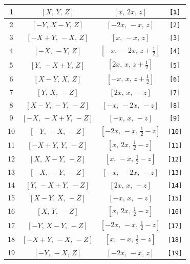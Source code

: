 \documentclass[fleqn,8pt]{jsarticle}
\begin{document}
\begin{longtable}{cccc}
1 & $\left[ X,\, Y,\, Z \right]$ & $\left[ x,\, 2 x,\, z \right]$ & {\tt [1]} \\ \hline
2 & $\left[ - Y,\, X - Y,\, Z \right]$ & $\left[ - 2 x,\, - x,\, z \right]$ & {\tt [2]} \\ \hline
3 & $\left[ - X + Y,\, - X,\, Z \right]$ & $\left[ x,\, - x,\, z \right]$ & {\tt [3]} \\ \hline
4 & $\left[ - X,\, - Y,\, Z \right]$ & $\left[ - x,\, - 2 x,\, z + \frac{1}{2} \right]$ & {\tt [4]} \\ \hline
5 & $\left[ Y,\, - X + Y,\, Z \right]$ & $\left[ 2 x,\, x,\, z + \frac{1}{2} \right]$ & {\tt [5]} \\ \hline
6 & $\left[ X - Y,\, X,\, Z \right]$ & $\left[ - x,\, x,\, z + \frac{1}{2} \right]$ & {\tt [6]} \\ \hline
7 & $\left[ Y,\, X,\, - Z \right]$ & $\left[ 2 x,\, x,\, - z \right]$ & {\tt [7]} \\ \hline
8 & $\left[ X - Y,\, - Y,\, - Z \right]$ & $\left[ - x,\, - 2 x,\, - z \right]$ & {\tt [8]} \\ \hline
9 & $\left[ - X,\, - X + Y,\, - Z \right]$ & $\left[ - x,\, x,\, - z \right]$ & {\tt [9]} \\ \hline
10 & $\left[ - Y,\, - X,\, - Z \right]$ & $\left[ - 2 x,\, - x,\, \frac{1}{2} - z \right]$ & {\tt [10]} \\ \hline
11 & $\left[ - X + Y,\, Y,\, - Z \right]$ & $\left[ x,\, 2 x,\, \frac{1}{2} - z \right]$ & {\tt [11]} \\ \hline
12 & $\left[ X,\, X - Y,\, - Z \right]$ & $\left[ x,\, - x,\, \frac{1}{2} - z \right]$ & {\tt [12]} \\ \hline
13 & $\left[ - X,\, - Y,\, - Z \right]$ & $\left[ - x,\, - 2 x,\, - z \right]$ & {\tt [13]} \\ \hline
14 & $\left[ Y,\, - X + Y,\, - Z \right]$ & $\left[ 2 x,\, x,\, - z \right]$ & {\tt [14]} \\ \hline
15 & $\left[ X - Y,\, X,\, - Z \right]$ & $\left[ - x,\, x,\, - z \right]$ & {\tt [15]} \\ \hline
16 & $\left[ X,\, Y,\, - Z \right]$ & $\left[ x,\, 2 x,\, \frac{1}{2} - z \right]$ & {\tt [16]} \\ \hline
17 & $\left[ - Y,\, X - Y,\, - Z \right]$ & $\left[ - 2 x,\, - x,\, \frac{1}{2} - z \right]$ & {\tt [17]} \\ \hline
18 & $\left[ - X + Y,\, - X,\, - Z \right]$ & $\left[ x,\, - x,\, \frac{1}{2} - z \right]$ & {\tt [18]} \\ \hline
19 & $\left[ - Y,\, - X,\, Z \right]$ & $\left[ - 2 x,\, - x,\, z \right]$ & {\tt [19]} \\ \hline

\end{longtable}
\end{document}
